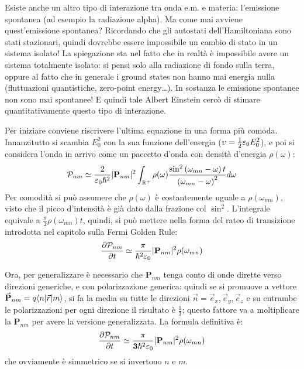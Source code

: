 Esiste anche un altro tipo di interazione tra onda e.m. e materia: l'emissione spontanea (ad esempio la radiazione alpha). Ma come mai avviene quest'emissione spontanea? Ricordando che gli autostati dell'Hamiltoniana sono stati stazionari, quindi dovrebbe essere impossibile un cambio di stato in un sistema isolato! La spiegazione sta nel fatto che in realtà è impossibile avere un sistema totalmente isolato: si pensi solo alla radiazione di fondo sulla terra, oppure al fatto che in generale i ground states non hanno mai energia nulla (fluttuazioni quantistiche, zero-point energy\ldots). In sostanza le emissione spontanee non sono mai spontanee! E quindi tale Albert Einstein cercò di stimare quantitativamente questo tipo di interazione.

\newpage

Per iniziare conviene riscrivere l'ultima equazione in una forma più comoda. Innanzitutto si scambia $E_0^2$ con la sua funzione dell'energia ($\upsilon = \frac{1}{2} \varepsilon_0 E_0^2$), e poi si considera l'onda in arrivo come un paccetto d'onda con densità d'energia $\rho(\omega)$:
\[
    \mathcal P_{nm} \simeq \frac{2}{\varepsilon_0\hslash^2} |\mathbf{P}_{nm}|^2 \int_{\mathbb{R}^+} \rho(\omega) \frac{\sin^2 \left(\omega_{mn}-\omega\right) t}{ \left(\omega_{mn}-\omega\right)^2} d\omega
\]
Per comodità si può assumere che $\rho(\omega)$ è costantemente uguale a $\rho(\omega_{mn})$, visto che il picco d'intensità è già dato dalla frazione col $\sin^2$. L'integrale equivale a $\frac{\pi}{2}\rho(\omega_{mn})t$, quindi, si può mettere nella forma del rateo di transizione introdotta nel capitolo sulla Fermi Golden Rule:
\[
    \frac{\partial \mathcal P_{nm}}{\partial t} \simeq \frac{\pi}{\hslash^2\varepsilon_0} |\mathbf{P}_{nm}|^2 \rho(\omega_{mn})
\]

Ora, per generalizzare è necessario che $\mathbf{P}_{nm}$ tenga conto di onde dirette verso direzioni generiche, e con polarizzazione generica: quindi se si promuove a vettore $\vec{\mathbf{P}}_{nm} = q\langle n | \vec r | m \rangle$, si fa la  media su tutte le direzioni $\vec n = \vec{e}_x, \vec{e}_y, \vec{e}_z$ e su entrambe le polarizzazioni per ogni direzione il risultato è $\frac{1}{3}$; questo fattore va a moltiplicare la $\mathbf{P}_{nm}$ per avere la versione generalizzata. La formula definitiva è:
\[
    \frac{\partial \mathcal P_{nm}}{\partial t} \simeq \frac{\pi}{\mathbf{3}\hslash^2\varepsilon_0} |\mathbf{P}_{nm}|^2 \rho(\omega_{mn})
\]
che ovviamente è simmetrico se si invertono $n$ e $m$.
\tab

